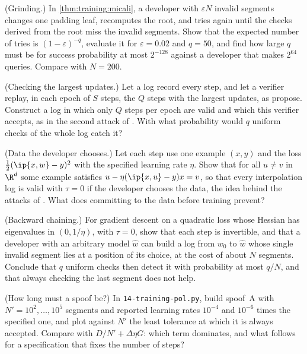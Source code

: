 \begin{refsection}
\begin{exercises}
\item \attack\hard (Grinding.) In \cref{thm:training:micali}, a developer with $\varepsilon N$ invalid segments changes one padding leaf, recomputes the root, and tries again until the checks derived from the root miss the invalid segments. Show that the expected number of tries is $(1-\varepsilon)^{-q}$, evaluate it for $\varepsilon=0.02$ and $q=50$, and find how large $q$ must be for success probability at most $2^{-128}$ against a developer that makes $2^{64}$ queries. Compare with $N=200$.\label{ex:training:grinding}

\item \attack (Checking the largest updates.) Let a log record every step, and let a verifier replay, in each epoch of $S$ steps, the $Q$ steps with the largest updates, as \textcite{JiaEtAl2021} propose. Construct a log in which only $Q$ steps per epoch are valid and which this verifier accepts, as in the second attack of \textcite{FangEtAl2023}. With what probability would $q$ uniform checks of the whole log catch it?\label{ex:training:topq}

\item \attack (Data the developer chooses.) Let each step use one example $(x,y)$ and the loss $\frac12(\ip{x,w}-y)^2$ with the specified learning rate $\eta$. Show that for all $u\ne v$ in $\R^d$ some example satisfies $u-\eta(\ip{x,u}-y)x=v$, so that every interpolation log is valid with $\tau=0$ if the developer chooses the data, the idea behind the attacks of \textcite{ZhangEtAl2022}. What does committing to the data before training prevent?\label{ex:training:data}

\item \attack\hard (Backward chaining.) For gradient descent on a quadratic loss whose Hessian has eigenvalues in $(0,1/\eta)$, with $\tau=0$, show that each step is invertible, and that a developer with an arbitrary model $\hat w$ can build a log from $w_0$ to $\hat w$ whose single invalid segment lies at a position of its choice, at the cost of about $N$ segments. Conclude that $q$ uniform checks then detect it with probability at most $q/N$, and that always checking the last segment does not help.\label{ex:training:backward}

\item \simulation (How long must a spoof be?) In \texttt{14-training-pol.py}, build spoof~A with $N'=10^2,\dots,10^5$ segments and reported learning rates $10^{-4}$ and $10^{-6}$ times the specified one, and plot against $N'$ the least tolerance at which it is always accepted. Compare with $D/N'+\Delta\eta G$: which term dominates, and what follows for a specification that fixes the number of steps?\label{ex:training:spooflength}


\end{exercises}
\end{refsection}
